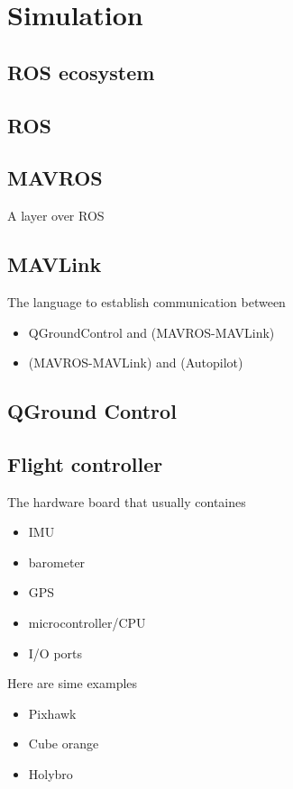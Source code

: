         
\section{Simulation}
    \subsection{ROS ecosystem}
    
    
    \subsection{ROS}
    
    
    \subsection{MAVROS}
    A layer over ROS
    
    
    \subsection{MAVLink}
    The language to establish communication between
    \begin{itemize}
        \item QGroundControl and (MAVROS-MAVLink)
        \item (MAVROS-MAVLink) and (Autopilot)
    \end{itemize}
    
    
    \subsection{QGround Control}
    
    
    \subsection{Flight controller}
    The hardware board that usually containes
    \begin{itemize}
        \item IMU
        \item barometer
        \item GPS
        \item microcontroller/CPU
        \item I/O ports
    \end{itemize}
    
    Here are sime examples
    \begin{itemize}
        \item Pixhawk
        \item Cube orange
        \item Holybro
    \end{itemize}
    
